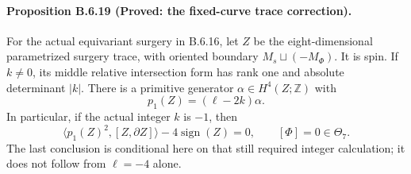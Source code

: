 \paragraph{Proposition B.6.19 (Proved: the fixed-curve trace correction).}
For the actual equivariant surgery in B.6.16, let $Z$ be the
eight-dimensional parametrized surgery trace, with oriented
boundary $M_s\sqcup(-M_\Phi)$.  It is spin.  If $k\ne0$,
its middle relative intersection form has rank one and absolute
determinant $|k|$.  There is a primitive generator
$\alpha\in H^4(Z;\mathbb Z)$ with
\[
                 p_1(Z)=(\ell-2k)\alpha.
 \tag{B.6.33}
\]
In particular, if the actual integer $k$ is $-1$, then
\[
 \langle p_1(Z)^2,[Z,\partial Z]\rangle
                  -4\operatorname{sign}(Z)=0,
 \qquad [\Phi]=0\in\Theta_7.
 \tag{B.6.34}
\]
The last conclusion is conditional here on that still required
integer calculation; it does not follow from $\ell=-4$ alone.
